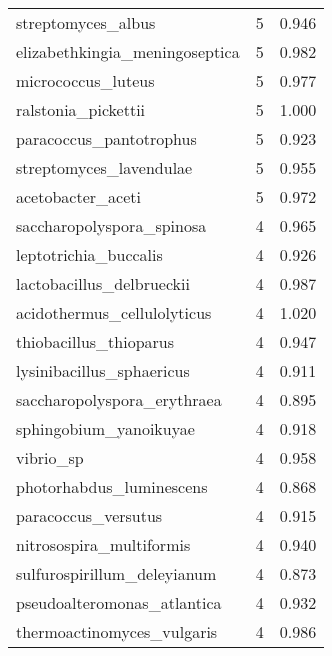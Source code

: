 \begin{tabular}{lrr}
                          streptomyces\_albus &                   5 &     0.946 \\
              elizabethkingia\_meningoseptica &                   5 &     0.982 \\
                          micrococcus\_luteus &                   5 &     0.977 \\
                         ralstonia\_pickettii &                   5 &     1.000 \\
                     paracoccus\_pantotrophus &                   5 &     0.923 \\
                     streptomyces\_lavendulae &                   5 &     0.955 \\
                           acetobacter\_aceti &                   5 &     0.972 \\
                   saccharopolyspora\_spinosa &                   4 &     0.965 \\
                       leptotrichia\_buccalis &                   4 &     0.926 \\
                   lactobacillus\_delbrueckii &                   4 &     0.987 \\
                 acidothermus\_cellulolyticus &                   4 &     1.020 \\
                      thiobacillus\_thioparus &                   4 &     0.947 \\
                   lysinibacillus\_sphaericus &                   4 &     0.911 \\
                 saccharopolyspora\_erythraea &                   4 &     0.895 \\
                      sphingobium\_yanoikuyae &                   4 &     0.918 \\
                                   vibrio\_sp &                   4 &     0.958 \\
                    photorhabdus\_luminescens &                   4 &     0.868 \\
                         paracoccus\_versutus &                   4 &     0.915 \\
                    nitrosospira\_multiformis &                   4 &     0.940 \\
                 sulfurospirillum\_deleyianum &                   4 &     0.873 \\
                 pseudoalteromonas\_atlantica &                   4 &     0.932 \\
                  thermoactinomyces\_vulgaris &                   4 &     0.986 \\

\end{tabular}
